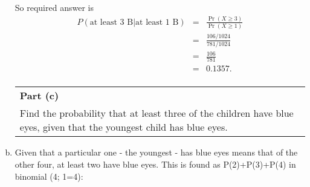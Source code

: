\documentclass[a4paper,12pt]{article}
\begin{document}
\begin{enumerate}[(a)]
So required answer is 
\begin{eqnarray*} P(\mbox{at least 3 B} | \mbox{at least 1 B})
&=& \frac{\Pr(X \geq 3)}{\Pr( X \geq 1)} \\ 
&=&  \frac{106/1024}{781/1024} \\ 
&=& \frac{106}{781} \\ 
&=& 0.1357.\\ \end{eqnarray*}
\newpage
  \begin{table}[ht!]
     \centering
     \begin{tabular}{|p{15cm}|}
     \hline  \large
\noindent \textbf{Part (c)}\\ \large Find the probability that at least three of the children have blue eyes, given that the youngest child has blue eyes.
\\ \hline
      \end{tabular}
    \end{table}

\item Given that a particular one - the youngest - has blue eyes means that of the
other four, at least two have blue eyes. This is found as P(2)+P(3)+P(4) in
binomial (4; 1=4): 


\end{enumerate}
\end{document}
